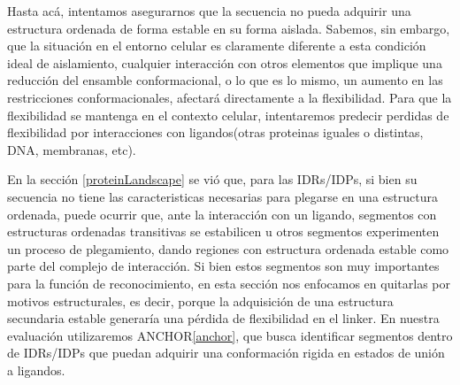 






Hasta acá, intentamos asegurarnos que la secuencia no pueda adquirir una estructura ordenada de forma estable en su forma aislada.
Sabemos, sin embargo, que la situación en el entorno celular es claramente diferente a esta condición ideal de aislamiento, 
cualquier interacción con otros elementos que implique una reducción del ensamble conformacional, o lo que es lo mismo, 
un aumento en las restricciones conformacionales, afectará directamente a la flexibilidad. 
Para que la flexibilidad se mantenga en el contexto celular, intentaremos predecir perdidas de flexibilidad por interacciones con ligandos(otras proteinas iguales o distintas, DNA, membranas, etc).


En la sección \ref{proteinLandscape} se vió que, para las IDRs/IDPs, si bien su secuencia no tiene las caracteristicas necesarias para plegarse en una estructura ordenada, puede ocurrir que, ante la interacción con un ligando, 
segmentos con estructuras ordenadas transitivas se estabilicen u otros segmentos experimenten un proceso de plegamiento, dando regiones con estructura ordenada estable como parte del complejo de interacción. 
Si bien estos segmentos son muy importantes para la función de reconocimiento, en esta sección nos enfocamos en quitarlas por motivos estructurales, es decir, porque la adquisición de una estructura secundaria estable
generaría una pérdida de flexibilidad en el linker.
En nuestra evaluación utilizaremos ANCHOR\ref{anchor}, que busca identificar segmentos dentro de IDRs/IDPs que puedan adquirir una conformación rigida en estados de unión a ligandos.

